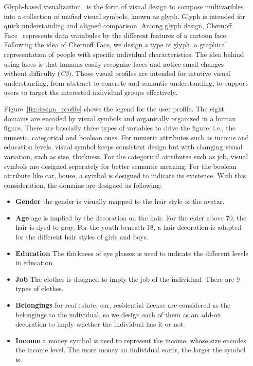 Glyph-based visualization~\cite{borgo2013glyph} is the form of visual design to compose multivaribles into a collection of unified visual symbols, known as glyph. Glyph is intended for quick understanding and aligned comparison. Among glyph design, Chernoff Face~\cite{chernoff1973use} represents data variabules by the different features of a cartoon face. Following the idea of Chernoff Face, we design a type of glyph, a graphical representation of people with specific individual characteristics. The idea behind using faces is that humans easily recognize faces and notice small changes without difficulty (\textit{C3}). Those visual profiles are intended for intutive visual understanding, from abstract to concrete and semantic understanding, to support users to target the interested individual groups effectively.

Figure~\ref{fig:design_profile} shows the legend for the user profile. The eight domains are encoded by visual symbols and organically organized in a human figure. There are bascially three types of variables to drive the figure, i.e., the numeric, categorical and boolean ones. For numeric attributes such as income and education levels, visual symbol keeps consistent design but with changing visual variation, such as size, thickness. For the categorical attributes such as job, visual symbols are designed seperately for better semantic meaning. For the boolean attribute like car, house, a symbol is designed to indicate its existence. With this consideration, the domains are designed as following:



\begin{itemize}
\item \textbf{Gender} the gender is visually mapped to the hair style of the avatar. 
\item \textbf{Age} age is implied by the decoration on the hair. For the elder above 70, the hair is dyed to gray. For the youth beneath 18, a hair decoration is adapted for the different hair styles of girls and boys.
\item \textbf{Education} The thickness of eye glasses is used to indicate the different levels in education.
\item \textbf{Job} The clothes is designed to imply the job of the individual. There are 9 types of clothes.
\item \textbf{Belongings} for real estate, car, residential license are considered as the belongings to the individual, so we design each of them as an add-on decoration to imply whether the individual has it or not.
\item \textbf{Income} a money symbol is used to represent the income, whose size encodes the income level. The more money an individual earns, the larger the symbol is.
\end{itemize} 

